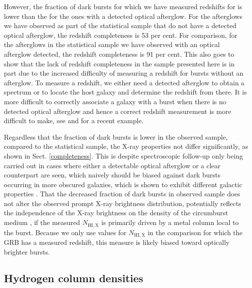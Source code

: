 \documentclass{aa}    %
\begin{document}
However, the fraction of dark bursts for which we have measured redshifts for is
lower than the for the ones with a detected optical afterglow. For the
afterglows we have observed as part of the statistical sample that do not have a
detected optical afterglow, the redshift completeness is 53 per cent. For
comparison, for the afterglows in the statistical sample we have observed with
an optical afterglow detected, the redshift completeness is 91 per cent. This
also goes to show that the lack of redshift completeness in the sample presented
here is in part due to the increased difficulty of measuring a redshift for
bursts without an afterglow. To measure a redshift, we either need a detected
afterglow to obtain a spectrum or to locate the host galaxy and determine the
redshift from there. It is more difficult to correctly associate a galaxy with a
burst when there is no detected optical afterglow and hence a correct redshift
measurement is more difficult to make, see \citet{Jakobsson2005, Levesque2010}
and \citet{Perley2017} for a recent example.

Regardless that the fraction of dark bursts is lower in the observed sample,
compared to the statistical sample, the X-ray properties not differ
significantly, as shown in Sect. \ref{completeness}. This is despite
spectroscopic follow-up only being carried out in cases where either a
detectable optical afterglow or a clear counterpart are seen, which naively
should be biased against dark bursts occurring in more obscured galaxies, which
is shown to exhibit different galactic properties \citep{Perley2009,
	Kruhler2011, Rossi2012, Perley2013b, Perley2015b}. That the decreased fraction
of dark bursts in observed sample does not alter the observed prompt X-ray
brightness distribution, potentially reflects the independence of the X-ray
brightness on the density of the circumburst medium \citep{Freedman2001,
	Berger2003, Nysewander2009}, if the measured $N_{\mathrm{HI, X}}$ is primarily
driven by a metal column local to the burst. Because we only use values for
$N_{\mathrm{HI, X}}$ in the comparison for which the GRB has a measured
redshift, this measure is likely biased toward optically brighter bursts.

\subsection{Hydrogen column densities}
\end{document}
